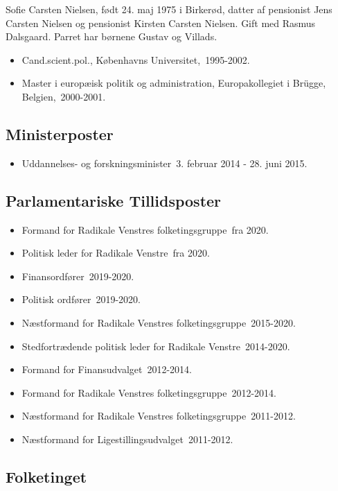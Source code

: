 \documentclass[11pt, a4paper]{awesome-cv}
\begin{document}
\makecvheader[R]
\makelettertitle
\begin{cvletter}
Sofie Carsten Nielsen, født 24. maj 1975 i Birkerød, datter af pensionist Jens Carsten Nielsen og pensionist Kirsten Carsten Nielsen. Gift med Rasmus Dalsgaard. Parret har børnene Gustav og Villads.

\begin{itemize}
\item Cand.scient.pol., Københavns Universitet, 1995-2002.
\item Master i europæisk politik og administration, Europakollegiet i Brügge, Belgien, 2000-2001.
\end{itemize}
\subsection*{Ministerposter}
\begin{itemize}
\item Uddannelses- og forskningsminister 3. februar 2014 - 28. juni 2015.
\end{itemize}
\subsection*{Parlamentariske Tillidsposter}
\begin{itemize}
\item Formand for Radikale Venstres folketingsgruppe fra 2020.
\item Politisk leder for Radikale Venstre fra 2020.
\item Finansordfører 2019-2020.
\item Politisk ordfører 2019-2020.
\item Næstformand for Radikale Venstres folketingsgruppe 2015-2020.
\item Stedfortrædende politisk leder for Radikale Venstre 2014-2020.
\item Formand for Finansudvalget 2012-2014.
\item Formand for Radikale Venstres folketingsgruppe 2012-2014.
\item Næstformand for Radikale Venstres folketingsgruppe 2011-2012.
\item Næstformand for Ligestillingsudvalget 2011-2012.
\end{itemize}
\subsection*{Folketinget}

\end{cvletter}
\end{document}
